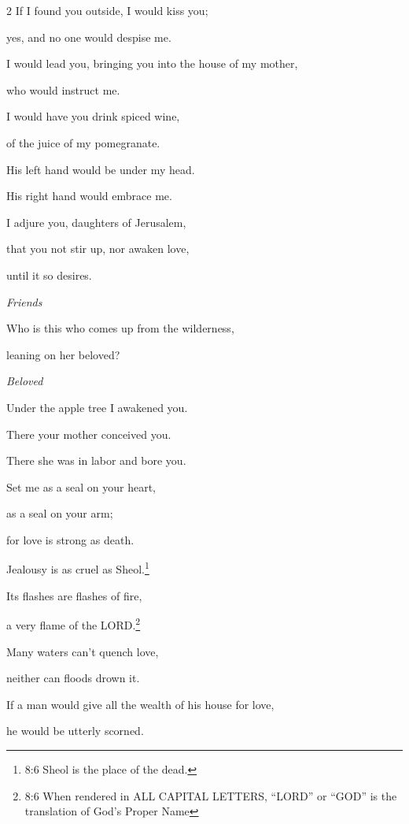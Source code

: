 \begin{multicols}{2}
If I found you outside, I would kiss you;

yes, and no one would despise me.

\myverse{}I would lead you, bringing you into the house of my mother,

who would instruct me.

I would have you drink spiced wine,

of the juice of my pomegranate.

\myverse{}His left hand would be under my head.

His right hand would embrace me.


\vspace{\baselineskip} 

\myverse{}I adjure you, daughters of Jerusalem,

that you not stir up, nor awaken love,

until it so desires.


\textit{Friends}

\myverse{}Who is this who comes up from the wilderness,

leaning on her beloved?

\vspace{\baselineskip} 

\textit{Beloved}

Under the apple tree I awakened you.

There your mother conceived you.

There she was in labor and bore you.


\vspace{\baselineskip}

 \myverse{}Set me as a seal on your heart,

as a seal on your arm;

for love is strong as death.

Jealousy is as cruel as Sheol.\footnote{8:6 Sheol is the place of the dead.
}

Its flashes are flashes of fire,

a very flame of the LORD.\footnote{8:6 When rendered in ALL CAPITAL LETTERS, “LORD” or “GOD” is the translation of God’s Proper Name}

\myverse{}Many waters can’t quench love,

neither can floods drown it.

If a man would give all the wealth of his house for love,

he would be utterly scorned.



\end{multicols}
